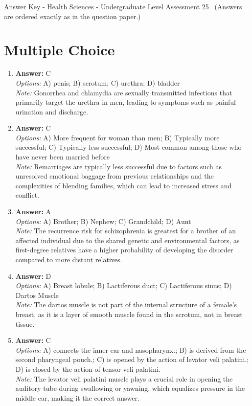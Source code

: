 \documentclass[12pt]{article}
\begin{document}
\begin{center}
Answer Key - Health Sciences - Undergraduate Level Assessment 25 \
\small (Answers are ordered exactly as in the question paper.)
\end{center}

\section*{Multiple Choice}
\begin{enumerate}[label=\arabic*.]
\item \textbf{Answer:} C
\\ \textit{Options:} A) penis; B) scrotum; C) urethra; D) bladder
\\ \textit{Note:} Gonorrhea and chlamydia are sexually transmitted infections that primarily target the urethra in men, leading to symptoms such as painful urination and discharge.
\item \textbf{Answer:} C
\\ \textit{Options:} A) More frequent for woman than men; B) Typically more successful; C) Typically less successful; D) Most common among those who have never been married before
\\ \textit{Note:} Remarriages are typically less successful due to factors such as unresolved emotional baggage from previous relationships and the complexities of blending families, which can lead to increased stress and conflict.
\item \textbf{Answer:} A
\\ \textit{Options:} A) Brother; B) Nephew; C) Grandchild; D) Aunt
\\ \textit{Note:} The recurrence risk for schizophrenia is greatest for a brother of an affected individual due to the shared genetic and environmental factors, as first-degree relatives have a higher probability of developing the disorder compared to more distant relatives.
\item \textbf{Answer:} D
\\ \textit{Options:} A) Breast lobule; B) Lactiferous duct; C) Lactiferous sinus; D) Dartos Muscle
\\ \textit{Note:} The dartos muscle is not part of the internal structure of a female's breast, as it is a layer of smooth muscle found in the scrotum, not in breast tissue.
\item \textbf{Answer:} C
\\ \textit{Options:} A) connects the inner ear and nasopharynx.; B) is derived from the second pharyngeal pouch.; C) is opened by the action of levator veli palatini.; D) is closed by the action of tensor veli palatini.
\\ \textit{Note:} The levator veli palatini muscle plays a crucial role in opening the auditory tube during swallowing or yawning, which equalizes pressure in the middle ear, making it the correct answer.
\end{enumerate}
\end{document}
